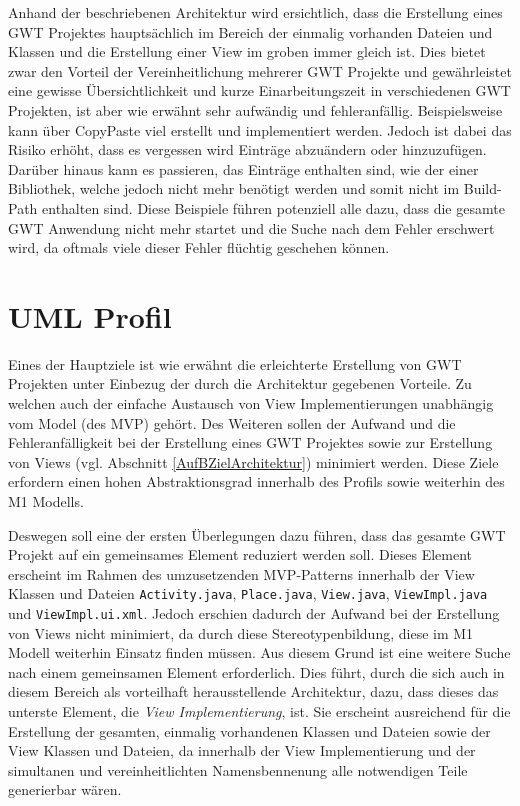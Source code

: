 Anhand der beschriebenen Architektur wird ersichtlich, dass die Erstellung eines
GWT Projektes hauptsächlich im Bereich der einmalig vorhanden Dateien und
Klassen und die Erstellung einer View im groben immer gleich ist. Dies bietet
zwar den Vorteil der Vereinheitlichung mehrerer GWT Projekte und gewährleistet
eine gewisse Übersichtlichkeit und kurze Einarbeitungszeit in verschiedenen GWT
Projekten, ist aber wie erwähnt sehr aufwändig und fehleranfällig.
Beispielsweise kann über \grqq{}CopyPaste\grqq{} viel erstellt und implementiert werden. Jedoch ist
dabei das Risiko erhöht, dass es vergessen wird Einträge abzuändern oder
hinzuzufügen. Darüber hinaus kann es passieren, das Einträge enthalten sind, wie
der einer Bibliothek, welche jedoch nicht mehr benötigt werden und somit nicht
im Build-Path enthalten sind.
Diese Beispiele führen potenziell alle dazu, dass die gesamte GWT Anwendung nicht mehr startet
und die Suche nach dem Fehler erschwert wird, da oftmals viele dieser
Fehler flüchtig geschehen können. 
\section{UML Profil}\label{AufBProfil}
Eines der Hauptziele ist wie erwähnt die erleichterte Erstellung von GWT
Projekten unter Einbezug der durch die Architektur gegebenen Vorteile. Zu
welchen auch der einfache Austausch von View Implementierungen unabhängig vom
Model (des MVP) gehört. Des Weiteren sollen der Aufwand und die
Fehleranfälligkeit bei der Erstellung eines GWT Projektes sowie zur Erstellung von Views (vgl.
Abschnitt \ref{AufBZielArchitektur}) minimiert werden. Diese Ziele
erfordern einen hohen Abstraktionsgrad innerhalb des Profils sowie weiterhin des
M1 Modells.

Deswegen soll eine der ersten Überlegungen dazu führen, dass das
gesamte GWT Projekt auf ein gemeinsames Element reduziert werden soll. Dieses
Element erscheint im Rahmen des umzusetzenden
MVP-Patterns innerhalb der View Klassen und Dateien
\texttt{Activity.java}, \texttt{Place.java},
\texttt{View.java}, \texttt{ViewImpl.java}
und \texttt{ViewImpl.ui.xml}. Jedoch erschien dadurch der Aufwand bei der
Erstellung von Views nicht minimiert, da durch diese Stereotypenbildung, diese
im M1 Modell weiterhin Einsatz finden müssen. Aus diesem Grund ist eine weitere
Suche nach einem gemeinsamen Element erforderlich. Dies führt, durch die sich
auch in diesem Bereich als vorteilhaft herausstellende Architektur, dazu, dass
dieses das unterste Element, die \textit{View Implementierung}, ist. Sie
erscheint ausreichend für die Erstellung der gesamten, einmalig vorhandenen
Klassen und Dateien sowie der View Klassen und Dateien, da innerhalb der View
Implementierung und der simultanen und vereinheitlichten Namensbennenung alle
notwendigen Teile generierbar wären. 

